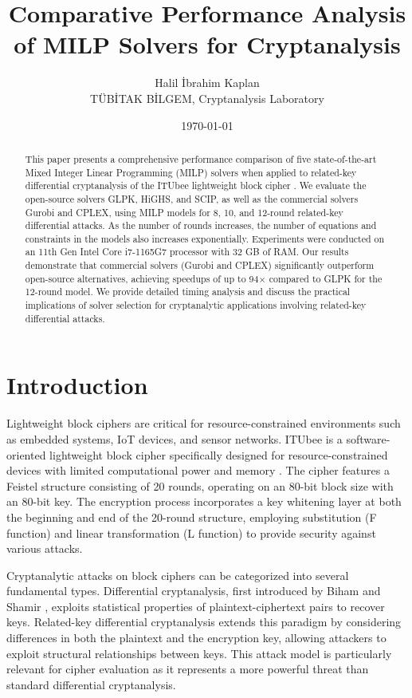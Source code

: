 \documentclass[11pt,a4paper]{article}
\title{Comparative Performance Analysis of MILP Solvers for Cryptanalysis}
\author{Halil İbrahim Kaplan\\TÜBİTAK BİLGEM, Cryptanalysis Laboratory}
\date{\today}
\begin{document}
\maketitle

\begin{abstract}
This paper presents a comprehensive performance comparison of five state-of-the-art Mixed Integer Linear Programming (MILP) solvers when applied to related-key differential cryptanalysis of the ITUbee lightweight block cipher \cite{karakoc2013itubee}. We evaluate the open-source solvers GLPK, HiGHS, and SCIP, as well as the commercial solvers Gurobi and CPLEX, using MILP models for 8, 10, and 12-round related-key differential attacks. As the number of rounds increases, the number of equations and constraints in the models also increases exponentially. Experiments were conducted on an 11th Gen Intel Core i7-1165G7 processor with 32 GB of RAM. Our results demonstrate that commercial solvers (Gurobi and CPLEX) significantly outperform open-source alternatives, achieving speedups of up to 94$\times$ compared to GLPK for the 12-round model. We provide detailed timing analysis and discuss the practical implications of solver selection for cryptanalytic applications involving related-key differential attacks.
\end{abstract}

\section{Introduction}
Lightweight block ciphers are critical for resource-constrained environments such as embedded systems, IoT devices, and sensor networks. ITUbee is a software-oriented lightweight block cipher specifically designed for resource-constrained devices with limited computational power and memory \cite{karakoc2013itubee}. The cipher features a Feistel structure consisting of 20 rounds, operating on an 80-bit block size with an 80-bit key. The encryption process incorporates a key whitening layer at both the beginning and end of the 20-round structure, employing substitution (F function) and linear transformation (L function) to provide security against various attacks.

Cryptanalytic attacks on block ciphers can be categorized into several fundamental types. Differential cryptanalysis, first introduced by Biham and Shamir \cite{biham1990differential}, exploits statistical properties of plaintext-ciphertext pairs to recover keys. Related-key differential cryptanalysis extends this paradigm by considering differences in both the plaintext and the encryption key, allowing attackers to exploit structural relationships between keys. This attack model is particularly relevant for cipher evaluation as it represents a more powerful threat than standard differential cryptanalysis.
\end{document}
